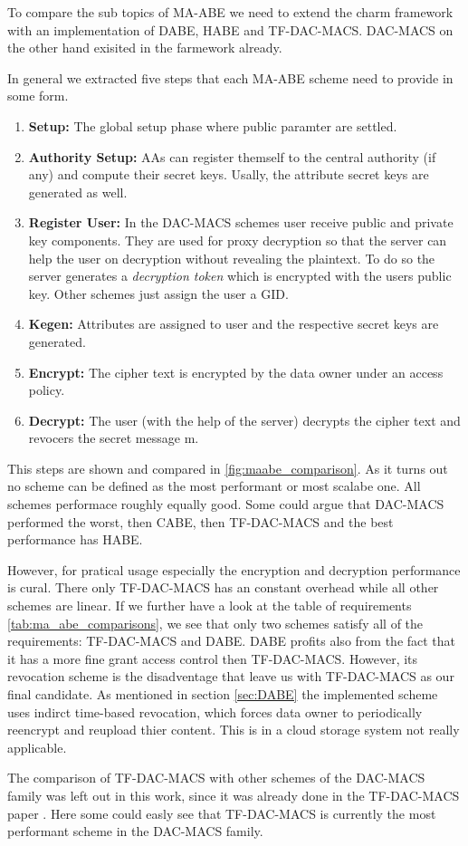 To compare the sub topics of MA-ABE we need to extend the charm framework with an implementation of DABE, HABE and TF-DAC-MACS. DAC-MACS on the other hand exisited in the farmework already. 

In general we extracted five steps that each MA-ABE scheme need to provide in some form. 
\begin{enumerate}
	\item \textbf{Setup:} The global setup phase where public paramter are settled.
	\item \textbf{Authority Setup:} AAs can register themself to the central authority (if any) and compute their secret keys. Usally, the attribute secret keys are generated as well. 
	\item \textbf{Register User:} In the DAC-MACS schemes user receive public and private key components. They are used for proxy decryption so that the server can help the user on decryption without revealing the plaintext. To do so the server generates a \textit{decryption token} which is encrypted with the users public key. Other schemes just assign the user a GID. 
	\item \textbf{Kegen:} Attributes are assigned to user and the respective secret keys are generated.
	\item \textbf{Encrypt:} The cipher text is encrypted by the data owner under an access policy.
	\item \textbf{Decrypt:} The user (with the help of the server) decrypts the cipher text and revocers the secret message m. 
\end{enumerate}

This steps are shown and compared in \ref{fig:maabe_comparison}. As it turns out no scheme can be defined as the most performant or most scalabe one. All schemes performace roughly equally good. Some could argue that DAC-MACS performed the worst, then CABE, then TF-DAC-MACS and the best performance has HABE. 

However, for pratical usage especially the encryption and decryption performance is cural. There only TF-DAC-MACS has an constant overhead while all other schemes are linear. If we further have a look at the table of requirements \ref{tab:ma_abe_comparisons}, we see that only two schemes satisfy all of the requirements: TF-DAC-MACS and DABE. DABE profits also from the fact that it has a more fine grant access control then TF-DAC-MACS. However, its revocation scheme is the disadventage that leave us with TF-DAC-MACS as our final candidate. As mentioned in section \ref{sec:DABE} the implemented scheme uses indirct time-based revocation, which forces data owner to periodically reencrypt and reupload thier content. This is in a cloud storage system not really applicable. 

The comparison of TF-DAC-MACS with other schemes of the DAC-MACS family was left out in this work, since it was already done in the TF-DAC-MACS paper \cite{li2017two}. Here some could easly see that TF-DAC-MACS is currently the most performant scheme in the DAC-MACS family.  